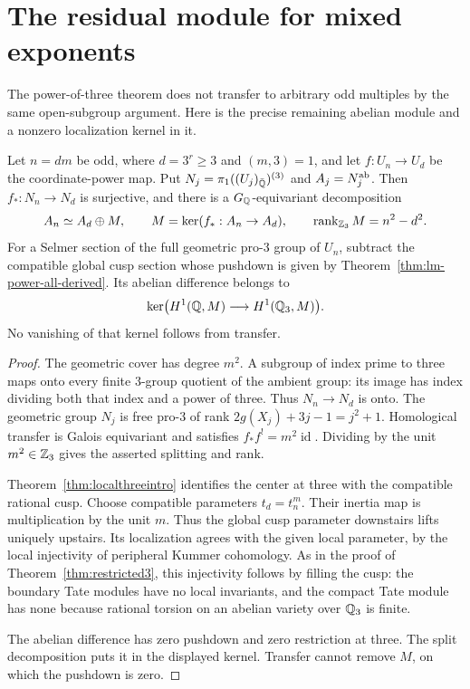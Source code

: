 \section{The residual module for mixed exponents}
\label{sec:mixed-exponents}

The power-of-three theorem does not transfer to arbitrary odd
multiples by the same open-subgroup argument. Here is the precise
remaining abelian module and a nonzero localization kernel in it.

\begin{proposition}
\label{prop:mixed-transfer}
Let $n=dm$ be odd, where $d=3^r\ge3$ and $(m,3)=1$, and let
$f:U_n\to U_d$ be the coordinate-power map. Put
$N_j=\pi_1((U_j)_{\bar{\mathbb Q}})^{(3)}$ and $A_j=N_j^{\mathrm{ab}}$.
Then $f_*:N_n\to N_d$ is surjective, and there is a
$G_\mathbb Q$-equivariant decomposition
\[
A_n\simeq A_d\oplus M,\qquad
M=\ker(f_*:A_n\to A_d),\qquad
\operatorname{rank}_{\mathbb Z_3}M=n^2-d^2.
\]
For a Selmer section of the full geometric pro-$3$ group of $U_n$,
subtract the compatible global cusp section whose pushdown is
given by Theorem~\ref{thm:lm-power-all-derived}. Its abelian difference
belongs to
\[
\ker\bigl(H^1(\mathbb Q,M)\longrightarrow H^1(\mathbb Q_3,M)\bigr).
\]
No vanishing of that kernel follows from transfer.
\end{proposition}
\begin{proof}
The geometric cover has degree $m^2$. A subgroup of index prime
to three maps onto every finite $3$-group quotient of the ambient
group: its image has index dividing both that index and a power
of three. Thus $N_n\to N_d$ is onto. The geometric group $N_j$
is free pro-$3$ of rank
$2g(X_j)+3j-1=j^2+1$. Homological transfer is Galois equivariant
and satisfies $f_*f^!=m^2\operatorname{id}$. Dividing by the
unit $m^2\in\mathbb Z_3$ gives the asserted splitting and rank.

Theorem~\ref{thm:localthreeintro} identifies the center at three
with the compatible rational cusp. Choose compatible parameters
$t_d=t_n^m$. Their inertia map is multiplication by the unit $m$.
Thus the global cusp parameter downstairs lifts uniquely upstairs.
Its localization agrees with the given local parameter, by the
local injectivity of peripheral Kummer cohomology. As in the proof
of Theorem~\ref{thm:restricted3}, this injectivity follows by
filling the cusp: the boundary Tate modules have no local
invariants, and the compact Tate module has none because rational
torsion on an abelian variety over $\mathbb Q_3$ is finite.

The abelian difference has zero pushdown and zero restriction
at three. The split decomposition puts it in the displayed
kernel. Transfer cannot remove $M$, on which the pushdown is zero.
\end{proof}

